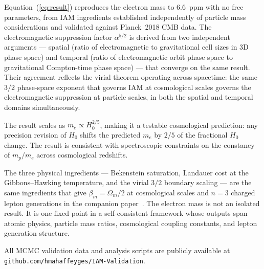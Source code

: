 \documentclass[12pt,a4paper]{article}
\begin{document}
Equation~(\ref{eq:result}) reproduces the electron mass to 6.6~ppm with no
free parameters, from IAM ingredients established independently of particle mass
considerations and validated against Planck~2018 CMB data. The electromagnetic
suppression factor $\alpha^{5/2}$ is derived from two independent arguments
--- spatial (ratio of electromagnetic to gravitational cell sizes in 3D phase
space) and temporal (ratio of electromagnetic orbit phase space to gravitational
Compton-time phase space) --- that converge on the same result. Their agreement
reflects the virial theorem operating across spacetime: the same $3/2$
phase-space exponent that governs IAM at cosmological scales governs the
electromagnetic suppression at particle scales, in both the spatial and temporal
domains simultaneously.

The result scales as $m_e \propto H_0^{2/5}$, making it a testable cosmological
prediction: any precision revision of $H_0$ shifts the predicted $m_e$ by $2/5$
of the fractional $H_0$ change. The result is consistent with spectroscopic
constraints on the constancy of $m_p/m_e$ across cosmological redshifts.

The three physical ingredients --- Bekenstein saturation, Landauer cost at the
Gibbons--Hawking temperature, and the virial $3/2$ boundary scaling --- are the
same ingredients that give $\beta_m = \Omega_m/2$ at cosmological scales and
$n = 3$ charged lepton generations in the companion paper~\cite{iam_generations}.
The electron mass is not an isolated result. It is one fixed point in a
self-consistent framework whose outputs span atomic physics, particle mass
ratios, cosmological coupling constants, and lepton generation structure.

All MCMC validation data and analysis scripts are publicly available at\\
\texttt{github.com/hmahaffeyges/IAM-Validation}.
\end{document}
